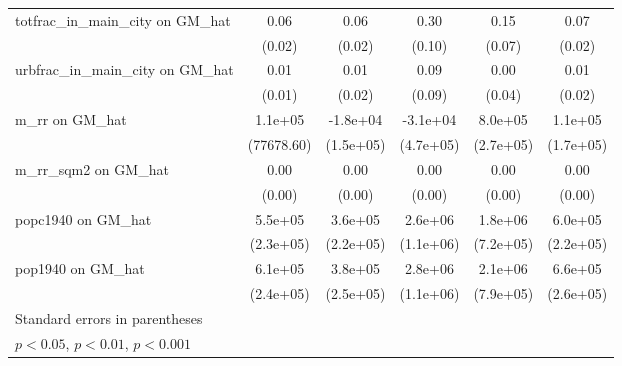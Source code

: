 \begin{table}[htbp]
\begin{tabular}{l*{5}{c}}
\addlinespace
totfrac\_in\_main\_city on GM\_hat&     0.06\sym{**} &     0.06\sym{**} &     0.30\sym{**} &     0.15\sym{*}  &     0.07\sym{***}\\
                &   (0.02)         &   (0.02)         &   (0.10)         &   (0.07)         &   (0.02)         \\
\addlinespace
urbfrac\_in\_main\_city on GM\_hat&     0.01         &     0.01         &     0.09         &     0.00         &     0.01         \\
                &   (0.01)         &   (0.02)         &   (0.09)         &   (0.04)         &   (0.02)         \\
\addlinespace
m\_rr on GM\_hat  &  1.1e+05         & -1.8e+04         & -3.1e+04         &  8.0e+05\sym{**} &  1.1e+05         \\
                &(77678.60)         &(1.5e+05)         &(4.7e+05)         &(2.7e+05)         &(1.7e+05)         \\
\addlinespace
m\_rr\_sqm2 on GM\_hat&     0.00\sym{*}  &     0.00\sym{*}  &     0.00\sym{**} &     0.00         &     0.00\sym{*}  \\
                &   (0.00)         &   (0.00)         &   (0.00)         &   (0.00)         &   (0.00)         \\
\addlinespace
popc1940 on GM\_hat&  5.5e+05\sym{*}  &  3.6e+05         &  2.6e+06\sym{*}  &  1.8e+06\sym{*}  &  6.0e+05\sym{**} \\
                &(2.3e+05)         &(2.2e+05)         &(1.1e+06)         &(7.2e+05)         &(2.2e+05)         \\
\addlinespace
pop1940 on GM\_hat&  6.1e+05\sym{*}  &  3.8e+05         &  2.8e+06\sym{*}  &  2.1e+06\sym{**} &  6.6e+05\sym{*}  \\
                &(2.4e+05)         &(2.5e+05)         &(1.1e+06)         &(7.9e+05)         &(2.6e+05)         \\
\bottomrule
\multicolumn{6}{l}{\footnotesize Standard errors in parentheses}\\
\multicolumn{6}{l}{\footnotesize \sym{*} \(p<0.05\), \sym{**} \(p<0.01\), \sym{***} \(p<0.001\)}\\
\end{tabular}
\end{table}
